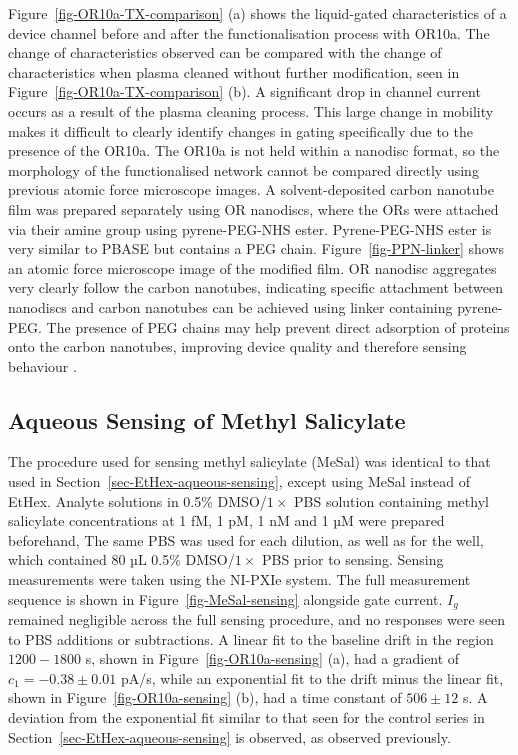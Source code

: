 \documentclass[
  a4paper,
]{scrbook}
\begin{document}
Figure~\ref{fig-OR10a-TX-comparison} (a) shows the liquid-gated
characteristics of a device channel before and after the
functionalisation process with OR10a. The change of characteristics
observed can be compared with the change of characteristics when plasma
cleaned without further modification, seen in
Figure~\ref{fig-OR10a-TX-comparison} (b). A significant drop in channel
current occurs as a result of the plasma cleaning process. This large
change in mobility makes it difficult to clearly identify changes in
gating specifically due to the presence of the OR10a. The OR10a is not
held within a nanodisc format, so the morphology of the functionalised
network cannot be compared directly using previous atomic force
microscope images. A solvent-deposited carbon nanotube film was prepared
separately using OR nanodiscs, where the ORs were attached via their
amine group using pyrene-PEG-NHS ester. Pyrene-PEG-NHS ester is very
similar to PBASE but contains a PEG chain. Figure~\ref{fig-PPN-linker}
shows an atomic force microscope image of the modified film. OR nanodisc
aggregates very clearly follow the carbon nanotubes, indicating specific
attachment between nanodiscs and carbon nanotubes can be achieved using
linker containing pyrene-PEG. The presence of PEG chains may help
prevent direct adsorption of proteins onto the carbon nanotubes,
improving device quality and therefore sensing behaviour
\autocite{Star2003a,Chen2004}.

\hypertarget{sec-MeSal-aqueous-sensing}{%
\subsection{Aqueous Sensing of Methyl
Salicylate}\label{sec-MeSal-aqueous-sensing}}

The procedure used for sensing methyl salicylate (MeSal) was identical
to that used in Section~\ref{sec-EtHex-aqueous-sensing}, except using
MeSal instead of EtHex. Analyte solutions in 0.5\% DMSO/\(1 \times\) PBS
solution containing methyl salicylate concentrations at 1 fM, 1 pM, 1 nM
and 1 µM were prepared beforehand, The same PBS was used for each
dilution, as well as for the well, which contained 80 µL 0.5\%
DMSO/\(1 \times\) PBS prior to sensing. Sensing measurements were taken
using the NI-PXIe system. The full measurement sequence is shown in
Figure~\ref{fig-MeSal-sensing} alongside gate current. \(I_g\) remained
negligible across the full sensing procedure, and no responses were seen
to PBS additions or subtractions. A linear fit to the baseline drift in
the region \(1200-1800\) s, shown in Figure~\ref{fig-OR10a-sensing} (a),
had a gradient of \(c_1 = -0.38\pm0.01\) pA/s, while an exponential fit
to the drift minus the linear fit, shown in
Figure~\ref{fig-OR10a-sensing} (b), had a time constant of
\(506 \pm 12\) s. A deviation from the exponential fit similar to that
seen for the control series in Section~\ref{sec-EtHex-aqueous-sensing}
is observed, as observed previously.
\end{document}
